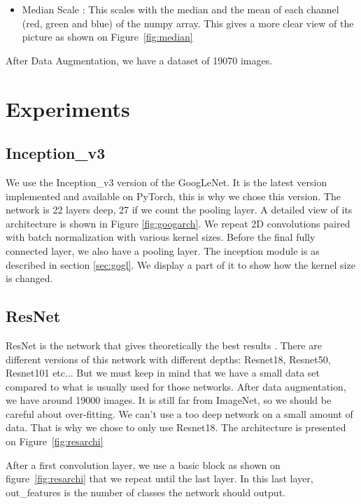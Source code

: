 \begin{itemize}
    \item Median Scale : This scales with the median and the mean of each channel (red, green and blue) of the numpy array. This gives a more clear view of the picture as shown on Figure~\ref{fig:median}  
 \end{itemize}

After Data Augmentation, we have a dataset of 19070 images. 


\section{Experiments}
\subsection{Inception\_v3}
We use the Inception\_v3 version of the GoogLeNet. It is the latest version implemented and available on PyTorch, this is why we chose this version. The network is 22 layers deep, 27 if we count the pooling layer. A detailed view of its architecture is shown in Figure \ref{fig:googarch}.
We repeat 2D convolutions paired with batch normalization with various kernel sizes. Before the final fully connected layer, we also have a pooling layer. The inception module is as described in section \ref{sec:gogl}. We display a part of it to show how the kernel size is changed.  
\subsection{ResNet}
ResNet is the network that gives theoretically the best results \cite{resnetpaper}. There are different versions of this network with different depths: Resnet18, Resnet50, Resnet101 etc... But we must keep in mind that we have a small data set compared to what is usually used for those networks. After data augmentation, we have around 19000 images. It is still far from ImageNet, so we should be careful about over-fitting. We can't use a too deep network on a small amount of data. That is why we chose to only use Resnet18. The architecture is presented on Figure~\ref{fig:resarchi}

After a first convolution layer, we use a basic block as shown on figure~\ref{fig:resarchi} that we repeat until the last layer. In this last layer, out\_features is the number of classes the network should output. 
